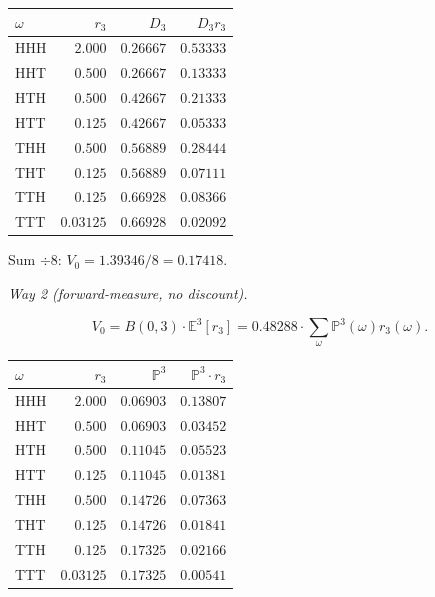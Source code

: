 \documentclass[
  10pt,
  twoside]{book}
\newcounter{none} %
\begin{document}
{\def\LTcaptype{none} %
\begin{table}[H]
\centering
\begin{tabular}{|l|r|r|r|}
\toprule
\(\omega\) & \(r_3\) & \(D_3\) & \(D_3 r_3\) \\
\midrule



HHH & \(2.000\) & \(0.26667\) & \(0.53333\) \\
HHT & \(0.500\) & \(0.26667\) & \(0.13333\) \\
HTH & \(0.500\) & \(0.42667\) & \(0.21333\) \\
HTT & \(0.125\) & \(0.42667\) & \(0.05333\) \\
THH & \(0.500\) & \(0.56889\) & \(0.28444\) \\
THT & \(0.125\) & \(0.56889\) & \(0.07111\) \\
TTH & \(0.125\) & \(0.66928\) & \(0.08366\) \\
TTT & \(0.03125\) & \(0.66928\) & \(0.02092\) \\
\bottomrule
\end{tabular}
\end{table}
}

Sum \(\div 8\): \(V_0 = 1.39346/8 = 0.17418\).

\emph{Way 2 (forward-measure, no discount).}

\[V_0 = B(0, 3) \cdot \mathbb E^3[r_3] = 0.48288 \cdot \sum_\omega \mathbb P^3(\omega) r_3(\omega).\]

{\def\LTcaptype{none} %
\begin{table}[H]
\centering
\begin{tabular}{|l|r|r|r|}
\toprule
\(\omega\) & \(r_3\) & \(\mathbb P^3\) & \(\mathbb P^3 \cdot r_3\) \\
\midrule



HHH & \(2.000\) & \(0.06903\) & \(0.13807\) \\
HHT & \(0.500\) & \(0.06903\) & \(0.03452\) \\
HTH & \(0.500\) & \(0.11045\) & \(0.05523\) \\
HTT & \(0.125\) & \(0.11045\) & \(0.01381\) \\
THH & \(0.500\) & \(0.14726\) & \(0.07363\) \\
THT & \(0.125\) & \(0.14726\) & \(0.01841\) \\
TTH & \(0.125\) & \(0.17325\) & \(0.02166\) \\
TTT & \(0.03125\) & \(0.17325\) & \(0.00541\) \\
\bottomrule
\end{tabular}
\end{table}
}
\end{document}
